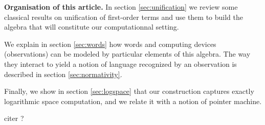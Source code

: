 

\smallskip\noindent
\textbf{Organisation of this article.} In section \ref{sec:unification} we review some classical results on unification of first-order terms and use them to build the algebra that will constitute our computationnal setting.

We explain in section \ref{sec:words} how words and computing devices (observations) can be modeled by particular elements of this algebra. The way they interact to yield a notion of language recognized by an observation is described in section \ref{sec:normativity}.

Finally, we show in section \ref{sec:logspace} that our construction captures exactly logarithmic space computation, and we relate it with a notion of pointer machine.

citer \cite{girard_three_lightings} ?